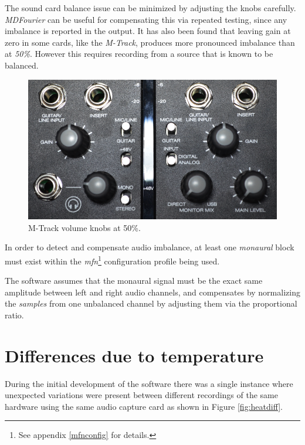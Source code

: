 \documentclass[10pt,a4paper]{report}
\begin{document}
\begin{appendices}
The sound card balance issue can be minimized by adjusting the knobs carefully. \textit{MDFourier} can be useful for compensating this via repeated testing, since any imbalance is reported in the output. It has also been found that leaving gain at zero in some cards, like the \textit{M-Track}, produces more pronounced imbalance than at \textit{50\%}. However this requires recording from a source that is known to be balanced.

\begin{figure}[H]
	\centering
	\includegraphics[width=0.8\linewidth]{images/imbalance/mtrack.png}
	\caption[M-Track knobs]{M-Track volume knobs at 50\%.}
	\label{fig:mtrackknobs}
\end{figure}

In order to detect and compensate audio imbalance, at least one \textit{monaural} block must exist within the \textit{mfn}\footnote{See appendix \ref{mfnconfig} for details.} configuration profile being used.

The software assumes that the monaural signal must be the exact same amplitude between left and right audio channels, and compensates by normalizing the \textit{samples} from one unbalanced channel by adjusting them via the proportional ratio. 

\chapter{Differences due to temperature}

During the initial development of the software there was a single instance where unexpected variations were present between different recordings of the same hardware using the same audio capture card as shown in Figure \ref{fig:heatdiff}.


\end{appendices}
\end{document}
